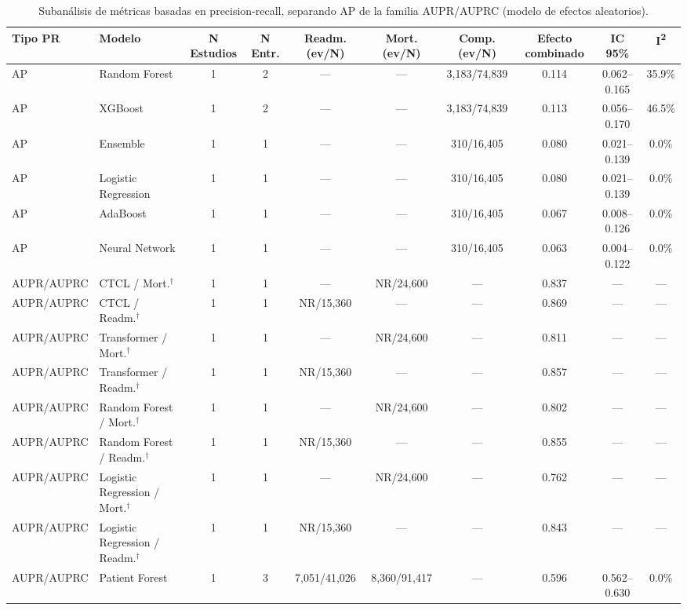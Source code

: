 \begin{table}[H]
\centering
\caption{Subanálisis de métricas basadas en precision-recall, separando AP de la familia AUPR/AUPRC (modelo de efectos aleatorios).}\label{tab:subgroup_pr}
\small
\begin{adjustbox}{max width=\textwidth}
\begin{tabular}{llcccccccc}
\toprule
\textbf{Tipo PR} & \textbf{Modelo} & \textbf{N Estudios} & \textbf{N Entr.} & \textbf{Readm. (ev/N)} & \textbf{Mort. (ev/N)} & \textbf{Comp. (ev/N)} & \textbf{Efecto combinado} & \textbf{IC 95\%} & \textbf{I\textsuperscript{2}} \\
\midrule
    AP & Random Forest & 1 & 2 & --- & --- & 3,183/74,839 & 0.114 & 0.062--0.165 & 35.9\% \\
    AP & XGBoost & 1 & 2 & --- & --- & 3,183/74,839 & 0.113 & 0.056--0.170 & 46.5\% \\
    AP & Ensemble & 1 & 1 & --- & --- & 310/16,405 & 0.080 & 0.021--0.139 & 0.0\% \\
    AP & Logistic Regression & 1 & 1 & --- & --- & 310/16,405 & 0.080 & 0.021--0.139 & 0.0\% \\
    AP & AdaBoost & 1 & 1 & --- & --- & 310/16,405 & 0.067 & 0.008--0.126 & 0.0\% \\
    AP & Neural Network & 1 & 1 & --- & --- & 310/16,405 & 0.063 & 0.004--0.122 & 0.0\% \\
    AUPR/AUPRC & CTCL / Mort.$^\dagger$ & 1 & 1 & --- & NR/24,600 & --- & 0.837 & --- & --- \\
    AUPR/AUPRC & CTCL / Readm.$^\dagger$ & 1 & 1 & NR/15,360 & --- & --- & 0.869 & --- & --- \\
    AUPR/AUPRC & Transformer / Mort.$^\dagger$ & 1 & 1 & --- & NR/24,600 & --- & 0.811 & --- & --- \\
    AUPR/AUPRC & Transformer / Readm.$^\dagger$ & 1 & 1 & NR/15,360 & --- & --- & 0.857 & --- & --- \\
    AUPR/AUPRC & Random Forest / Mort.$^\dagger$ & 1 & 1 & --- & NR/24,600 & --- & 0.802 & --- & --- \\
    AUPR/AUPRC & Random Forest / Readm.$^\dagger$ & 1 & 1 & NR/15,360 & --- & --- & 0.855 & --- & --- \\
    AUPR/AUPRC & Logistic Regression / Mort.$^\dagger$ & 1 & 1 & --- & NR/24,600 & --- & 0.762 & --- & --- \\
    AUPR/AUPRC & Logistic Regression / Readm.$^\dagger$ & 1 & 1 & NR/15,360 & --- & --- & 0.843 & --- & --- \\
    AUPR/AUPRC & Patient Forest & 1 & 3 & 7,051/41,026 & 8,360/91,417 & --- & 0.596 & 0.562--0.630 & 0.0\% \\

\end{tabular}
\end{adjustbox}
\end{table}
